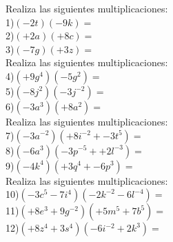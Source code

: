\documentclass[a4paper,12pt]{article}
\begin{document}
 \pagebreak 
Realiza las siguientes multiplicaciones: \vspace{1cm}\\ 
1)$(-2t)(-9k)=$\vspace{1cm}\\ 
2)$(+2a)(+8c)=$\vspace{1cm}\\ 
3)$(-7g)(+3z)=$\vspace{1cm}\\ 
Realiza las siguientes multiplicaciones: \vspace{1cm}\\ 
4)$(+9g^{4})(-5g^{2} )=$\vspace{1cm}\\ 
5)$(-8j^{2})(-3j^{-2} )=$\vspace{1cm}\\ 
6)$(-3a^{3})(+8a^{2} )=$\vspace{1cm}\\ 
Realiza las siguientes multiplicaciones: \vspace{1cm}\\ 
7)$(-3a^{-2})(+8i^{-2}+-3t^{5} )=$\vspace{1cm}\\ 
8)$(-6a^{3})(-3p^{-5}++2l^{-3} )=$\vspace{1cm}\\ 
9)$(-4k^{4})(+3q^{4}+-6p^{3} )=$\vspace{1cm}\\ 
Realiza las siguientes multiplicaciones: \vspace{1cm}\\ 
10)$(-3c^{5}-7i^{4} )(-2k^{-2}-6l^{-4} )=$\vspace{1cm}\\ 
11)$(+8e^{3}+9g^{-2} )(+5m^{5}+7b^{5} )=$\vspace{1cm}\\ 
12)$(+8z^{4}+3s^{4} )(-6i^{-2}+2k^{3} )=$\vspace{1cm}\\ 
\end{document}
